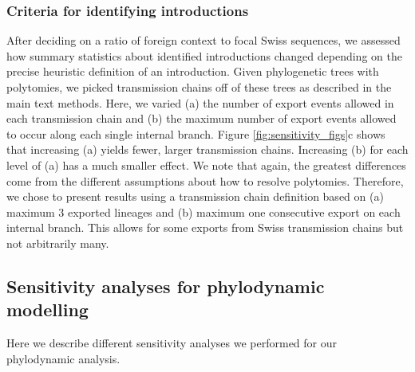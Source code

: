 \documentclass[9pt,twoside,lineno]{pnas-new}
\begin{document}
\subsubsection{Criteria for identifying introductions}
After deciding on a ratio of foreign context to focal Swiss sequences, we assessed how summary statistics about identified introductions changed depending on the precise heuristic definition of an introduction. Given phylogenetic trees with polytomies, we picked transmission chains off of these trees as described in the main text methods. Here, we varied (a) the number of export events allowed in each transmission chain and (b) the maximum number of export events allowed to occur along each single internal branch. Figure \ref{fig:sensitivity_figs}c shows that increasing (a) yields fewer, larger transmission chains. Increasing (b) for each level of (a) has a much smaller effect. We note that again, the greatest differences come from the different assumptions about how to resolve polytomies. Therefore, we chose to present results using a transmission chain definition based on (a) maximum 3 exported lineages and (b) maximum one consecutive export on each internal branch. This allows for some exports from Swiss transmission chains but not arbitrarily many. 

\subsection{Sensitivity analyses for phylodynamic modelling}
Here we describe different sensitivity analyses we performed for our phylodynamic analysis.
\end{document}

